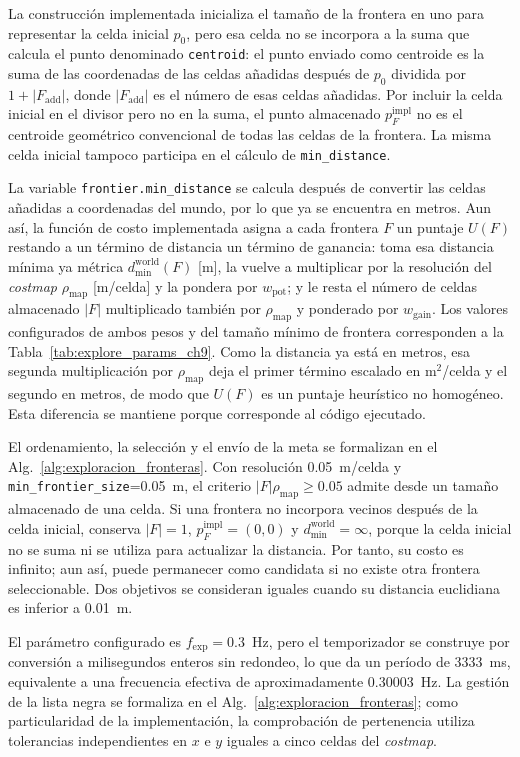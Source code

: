 \begin{appendices}
La construcción implementada inicializa el tamaño de la frontera en uno para representar la celda inicial $p_0$, pero esa celda no se incorpora a la suma que calcula el punto denominado \texttt{centroid}: el punto enviado como centroide es la suma de las coordenadas de las celdas añadidas después de $p_0$ dividida por $1+|F_{\mathrm{add}}|$, donde $|F_{\mathrm{add}}|$ es el número de esas celdas añadidas. Por incluir la celda inicial en el divisor pero no en la suma, el punto almacenado $p_F^{\mathrm{impl}}$ no es el centroide geométrico convencional de todas las celdas de la frontera. La misma celda inicial tampoco participa en el cálculo de \texttt{min\_distance}.

La variable \texttt{frontier.min\_distance} se calcula después de convertir las celdas añadidas a coordenadas del mundo, por lo que ya se encuentra en metros. Aun así, la función de costo implementada asigna a cada frontera $F$ un puntaje $U(F)$ restando a un término de distancia un término de ganancia: toma esa distancia mínima ya métrica $d_{\mathrm{min}}^{\mathrm{world}}(F)$ [m], la vuelve a multiplicar por la resolución del \textit{costmap} $\rho_{\mathrm{map}}$ [m/celda] y la pondera por $w_{\mathrm{pot}}$; y le resta el número de celdas almacenado $|F|$ multiplicado también por $\rho_{\mathrm{map}}$ y ponderado por $w_{\mathrm{gain}}$. Los valores configurados de ambos pesos y del tamaño mínimo de frontera corresponden a la Tabla~\ref{tab:explore_params_ch9}. Como la distancia ya está en metros, esa segunda multiplicación por $\rho_{\mathrm{map}}$ deja el primer término escalado en m$^2$/celda y el segundo en metros, de modo que $U(F)$ es un puntaje heurístico no homogéneo. Esta diferencia se mantiene porque corresponde al código ejecutado.

El ordenamiento, la selección y el envío de la meta se formalizan en el Alg.~\ref{alg:exploracion_fronteras}. Con resolución 0.05~m/celda y \texttt{min\_frontier\_size}=0.05~m, el criterio $|F|\rho_{\mathrm{map}}\geq0.05$ admite desde un tamaño almacenado de una celda. Si una frontera no incorpora vecinos después de la celda inicial, conserva $|F|=1$, $p_F^{\mathrm{impl}}=(0,0)$ y $d_{\mathrm{min}}^{\mathrm{world}}=\infty$, porque la celda inicial no se suma ni se utiliza para actualizar la distancia. Por tanto, su costo es infinito; aun así, puede permanecer como candidata si no existe otra frontera seleccionable. Dos objetivos se consideran iguales cuando su distancia euclidiana es inferior a 0.01~m.

El parámetro configurado es $f_{\mathrm{exp}}=0.3$~Hz, pero el temporizador se construye por conversión a milisegundos enteros sin redondeo, lo que da un período de 3333~ms, equivalente a una frecuencia efectiva de aproximadamente 0.30003~Hz. La gestión de la lista negra se formaliza en el Alg.~\ref{alg:exploracion_fronteras}; como particularidad de la implementación, la comprobación de pertenencia utiliza tolerancias independientes en $x$ e $y$ iguales a cinco celdas del \textit{costmap}.


\end{appendices}

